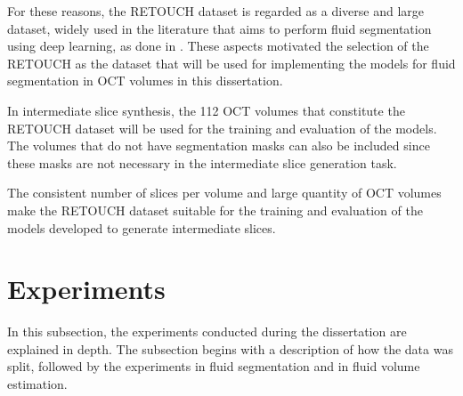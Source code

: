 \par
For these reasons, the RETOUCH dataset is regarded as a diverse and large dataset, widely used in the literature that aims to perform fluid segmentation using deep learning, as done in \parencite{Rahil2023, Zhang2023, Xing2022, Tang2022, Liu2024, Li2023, Hassan2021b, Lu2019}. These aspects motivated the selection of the RETOUCH as the dataset that will be used for implementing the models for fluid segmentation in OCT volumes in this dissertation.
\par
In intermediate slice synthesis, the 112 OCT volumes that constitute the RETOUCH dataset will be used for the training and evaluation of the models. The volumes that do not have segmentation masks can also be included since these masks are not necessary in the intermediate slice generation task.
\par
The consistent number of slices per volume and large quantity of OCT volumes make the RETOUCH dataset suitable for the training and evaluation of the models developed to generate intermediate slices.

\section{Experiments}\label{Experiments}
In this subsection, the experiments conducted during the dissertation are explained in depth. The subsection begins with a description of how the data was split, followed by the experiments in fluid segmentation and in fluid volume estimation.

